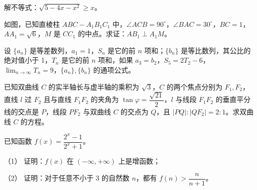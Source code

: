 \begin{question}

解不等式：$\sqrt{5-4x-x^2}\ge x$。

\Needspace{0.4\textheight}
\end{question}
\begin{question}

如图，已知直棱柱 $ABC-A_1B_1C_1$ 中，$\angle ACB=90^\circ$，$\angle BAC=30^\circ$，$BC=1$，$AA_1=\sqrt6$，$M$ 是 $CC_1$ 的中点。求证：$AB_1\perp A_1M$。
\nopagebreak[4]
\begin{center}\end{center}
\nopagebreak[4]
\end{question}
\begin{question}
设 $\{a_n\}$ 是等差数列，$a_1=1$，$S_n$ 是它的前 $n$ 项和；$\{b_n\}$ 是等比数列，其公比的绝对值小于 1，$T_n$ 是它的前 $n$ 项和，如果 $a_3=b_2$，$S_5=2T_2-6$，$\displaystyle\lim_{n\to\infty}T_n=9$，$\{a_n\},\{b_n\}$ 的通项公式。

\end{question}
\begin{question}
已知双曲线 $C$ 的实半轴长与虚半轴的乘积为 $\sqrt3$，$C$ 的两个焦点分别为 $F_1,F_2$，直线 $l$ 过 $F_2$ 且与直线 $F_1F_2$ 的夹角为 $\tan\varphi=\dfrac{\sqrt{21}}2$，$l$ 与线段 $F_1F_2$ 的垂直平分线的交点是 $P$，线段 $PF_2$ 与双曲线 $C$ 的交点为 $Q$，且 $|PQ|:|QF_2|=2:1$。求双曲线 $C$ 的方程。

\end{question}
\begin{question}
已知函数 $f(x)=\dfrac{2^x-1}{2^x+1}$。

（1） 证明：$f(x)$ 在 $(-\infty,+\infty)$ 上是增函数；

（2） 证明：对于任意不小于 3 的自然数 $n$，都有 $f(n)>\dfrac n{n+1}$。

\end{question}